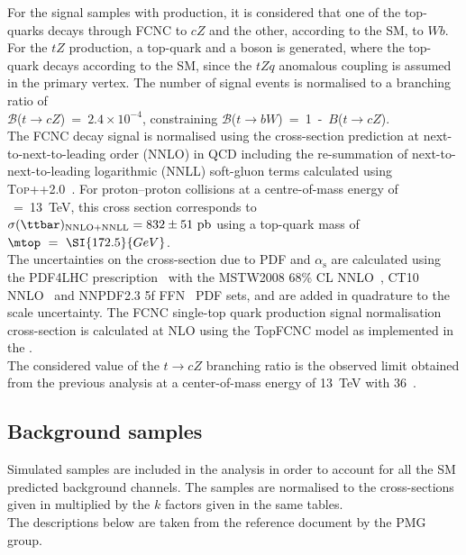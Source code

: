 \noindent For the signal samples with \ttbar production, it is considered that one of the top-quarks decays through FCNC to $cZ$ and the other, according to the SM, to $Wb$.\\ 
For the $tZ$ production, a top-quark and a \PZ boson is generated, where the top-quark decays according to the SM, since the $tZq$ anomalous coupling is assumed in the primary vertex. 
The number of signal events is normalised to a branching ratio of \\ \mbox{$\mathcal{B}$($t\rightarrow cZ$) = $2.4\times10^{-4}$}, constraining \mbox{$\mathcal{B}$($t\rightarrow bW$) = 1 - $B$($t\rightarrow cZ$).}\\ 
The FCNC \ttbar decay signal
is normalised using the \ttbar cross-section prediction at next-to-next-to-leading order (NNLO)
in QCD including the re-summation of next-to-next-to-leading logarithmic (NNLL) soft-gluon terms calculated using
\textsc{Top++2.0}~\cite{Beneke:2011mq,Cacciari:2011hy,Baernreuther:2012ws,Czakon:2012zr,Czakon:2012pz,Czakon:2013goa,Czakon:2011xx}.
For proton--proton collisions at a centre-of-mass energy of \rts~=~\SI{13}{\TeV}, this cross section corresponds to
$\sigma(\ttbar)_{\textrm{NNLO+NNLL}} = \mathrm{832\pm51~pb}$ using a top-quark mass of \\$\mtop~ =~\SI{172.5}{GeV}$.\\
The uncertainties on the cross-section due to PDF and $\alpha_{\textrm{s}}$ are calculated using the PDF4LHC prescription~\cite{Botje:2011sn}
with the MSTW2008 68\% CL NNLO~\cite{Martin:2009iq,Martin:2009bu}, CT10 NNLO~\cite{Lai:2010vv,Gao:2013xoa} and NNPDF2.3 5f FFN~\cite{Ball:2012cx} PDF sets,
and are added in quadrature to the scale uncertainty.
The FCNC single-top quark production signal normalisation cross-section is calculated at 
NLO using the TopFCNC model as implemented in the \aMCatNLO.  \\
The considered value of the $t\to cZ$ branching ratio is the observed limit obtained from
the previous analysis at a center-of-mass energy of \SI{13}{\TeV} with \SI{36}{\ifb}~\cite{TOPQ-2017-06}. 

\subsection{Background samples}
\label{sec:samples:mc:bkg}

Simulated samples are included in the analysis in order to account for all the SM predicted background channels.
The samples are normalised to the cross-sections given in
\App{\ref{appendix:app_mc}} multiplied by the $k$ factors given in the same
tables.\\
The descriptions below are taken from the reference document by the
PMG group. 

